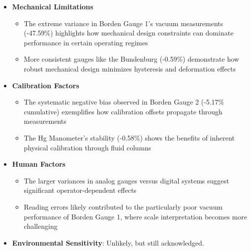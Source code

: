 \documentclass{article}
\begin{document}
\begin{itemize}
	\item \textbf{Mechanical Limitations}
	\begin{itemize}
		\item The extreme variance in Borden Gauge 1's vacuum measurements (-47.59\%) highlights how mechanical design constraints can dominate performance in certain operating regimes
		\item More consistent gauges like the Bundenburg (-0.59\%) demonstrate how robust mechanical design minimizes hysteresis and deformation effects
	\end{itemize}
	
	\item \textbf{Calibration Factors}
	\begin{itemize}
		\item The systematic negative bias observed in Borden Gauge 2 (-5.17\% cumulative) exemplifies how calibration offsets propagate through measurements
		\item The Hg Manometer's stability (-0.58\%) shows the benefits of inherent physical calibration through fluid columns
	\end{itemize}
	
	\item \textbf{Human Factors}
	\begin{itemize}
		\item The larger variances in analog gauges versus digital systems suggest significant operator-dependent effects
		\item Reading errors likely contributed to the particularly poor vacuum performance of Borden Gauge 1, where scale interpretation becomes more challenging
	\end{itemize}
	
	\item \textbf{Environmental Sensitivity}: Unlikely, but still acknowledged.
\end{itemize}
\end{document}
